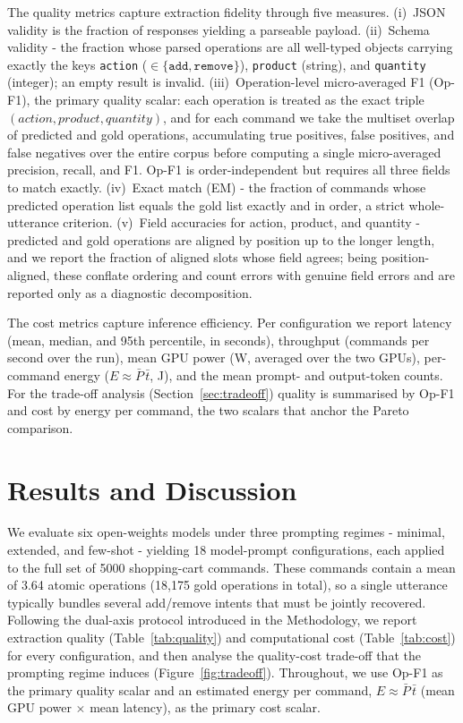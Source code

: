 \documentclass[journal,article,submit,pdftex,moreauthors]{Definitions/mdpi}
\begin{document}
The quality metrics capture extraction fidelity through five measures. (i)~JSON validity is the fraction of responses yielding a parseable payload. (ii)~Schema validity - the fraction whose parsed operations are all well-typed objects carrying exactly the keys \texttt{action} ($\in\{\texttt{add},\texttt{remove}\}$), \texttt{product} (string), and \texttt{quantity} (integer); an empty result is invalid. (iii)~Operation-level micro-averaged F1 (Op-F1), the primary quality scalar: each operation is treated as the exact triple $(action,product,quantity)$, and for each command we take the multiset overlap of predicted and gold operations, accumulating true positives, false positives, and false negatives over the entire corpus before computing a single micro-averaged precision, recall, and F1. Op-F1 is order-independent but requires all three fields to match exactly. (iv)~Exact match (EM) - the fraction of commands whose predicted operation list equals the gold list exactly and in order, a strict whole-utterance criterion. (v)~Field accuracies for action, product, and quantity - predicted and gold operations are aligned by position up to the longer length, and we report the fraction of aligned slots whose field agrees; being position-aligned, these conflate ordering and count errors with genuine field errors and are reported only as a diagnostic decomposition.

The cost metrics capture inference efficiency. Per configuration we report latency (mean, median, and 95th percentile, in seconds), throughput (commands per second over the run), mean GPU power (W, averaged over the two GPUs), per-command energy ($E\approx\bar{P}\,\bar{t}$, J), and the mean prompt- and output-token counts. For the trade-off analysis (Section~\ref{sec:tradeoff}) quality is summarised by Op-F1 and cost by energy per command, the two scalars that anchor the Pareto comparison.

\section{Results and Discussion}

We evaluate six open-weights models under three prompting regimes - minimal, extended, and few-shot - yielding 18 model-prompt configurations, each applied to the full set of 5000 shopping-cart commands. These commands contain a mean of 3.64 atomic operations (18{,}175 gold operations in total), so a single utterance typically bundles several add/remove intents that must be jointly recovered. Following the dual-axis protocol introduced in the Methodology, we report extraction quality (Table~\ref{tab:quality}) and computational cost (Table~\ref{tab:cost}) for every configuration, and then analyse the quality-cost trade-off that the prompting regime induces (Figure~\ref{fig:tradeoff}). Throughout, we use Op-F1 as the primary quality scalar and an estimated energy per command, $E \approx \bar{P}\,\bar{t}$ (mean GPU power $\times$ mean latency), as the primary cost scalar.
\end{document}
